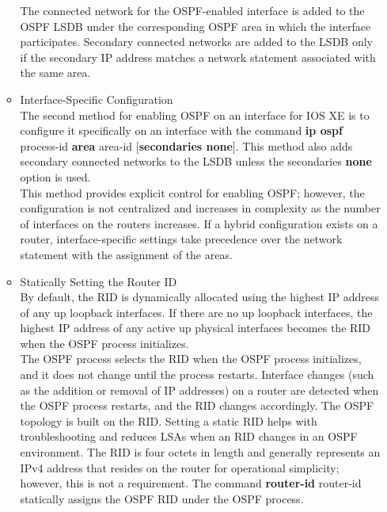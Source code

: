 \documentclass{article}
\begin{document}
\begin{itemize}
\begin{itemize}
				The connected network for the OSPF-enabled interface is added to the OSPF LSDB under the corresponding OSPF area in which the interface participates. Secondary connected networks are added to the LSDB only if the secondary IP address matches a network statement associated with the same area.\\

			\item Interface-Specific Configuration\\
				The second method for enabling OSPF on an interface for IOS XE is to configure it specifically on an interface with the command \textbf{ip ospf} process-id \textbf{area} area-id [\textbf{secondaries none}]. This method also adds secondary connected networks to the LSDB unless the secondaries \textbf{none} option is used.\\

				This method provides explicit control for enabling OSPF; however, the configuration is not centralized and increases in complexity as the number of interfaces on the routers increases. If a hybrid configuration exists on a router, interface-specific settings take precedence over the network statement with the assignment of the areas.\\
			\item Statically Setting the Router ID\\
				By default, the RID is dynamically allocated using the highest IP address of any up loopback interfaces. If there are no up loopback interfaces, the highest IP address of any active up physical interfaces becomes the RID when the OSPF process initializes.\\

				The OSPF process selects the RID when the OSPF process initializes, and it does not change until the process restarts. Interface changes (such as the addition or removal of IP addresses) on a router are detected when the OSPF process restarts, and the RID changes accordingly. The OSPF topology is built on the RID. Setting a static RID helps with troubleshooting and reduces LSAs when an RID changes in an OSPF environment. The RID is four octets in length and generally represents an IPv4 address that resides on the router for operational simplicity; however, this is not a requirement. The command \textbf{router-id} router-id statically assigns the OSPF RID under the OSPF process.\\


\end{itemize}
\end{itemize}
\end{document}
